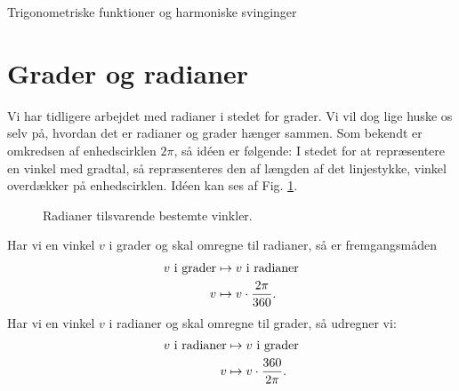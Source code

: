 \begin{center}
\Huge
Trigonometriske funktioner og harmoniske svinginger
\end{center}
\section*{Grader og radianer}

Vi har tidligere arbejdet med radianer i stedet for grader. Vi vil dog lige huske os selv på, hvordan det er radianer og grader hænger sammen. Som bekendt er omkredsen af enhedscirklen $2\pi$, så idéen er følgende: I stedet for at repræsentere en vinkel med gradtal, så repræsenteres den af længden af det linjestykke, vinkel overdækker på enhedscirklen. Idéen kan ses af Fig. \ref{fig:enhedscirkel}.
\begin{figure}[h]
	\centering
	\caption{Radianer tilsvarende bestemte vinkler.}
	\label{fig:enhedscirkel}
\end{figure}

\begin{setn}
Har vi en vinkel $v$ i grader og skal omregne til radianer, så er fremgangsmåden
\begin{align*}
	v\textnormal{ i grader} &\mapsto v \textnormal{ i radianer}\\
	v &\mapsto v\cdot \frac{2\pi}{360}.
\end{align*}
Har vi en vinkel $v$ i radianer og skal omregne til grader, så udregner vi:
\begin{align*}
	v\textnormal{ i radianer} &\mapsto v \textnormal{ i grader}\\
	v &\mapsto v\cdot \frac{360}{2\pi}.
\end{align*}
\end{setn}


